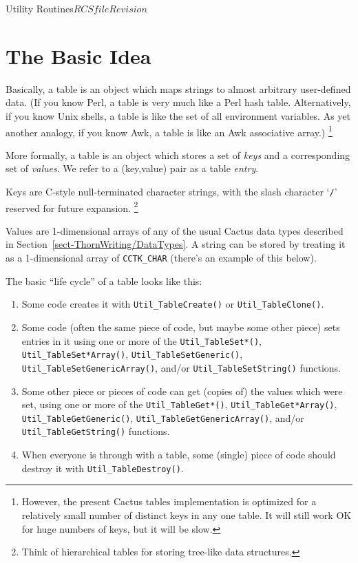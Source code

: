 \begin{cactuspart}{Utility Routines}{$RCSfile$}{$Revision$}

\section{The Basic Idea}

Basically, a table is an object which maps strings to almost arbitrary
user-defined data.  (If you know Perl, a table is very much like a
Perl hash table.  Alternatively, if you know Unix shells, a table is
like the set of all environment variables.  As yet another analogy,
if you know Awk, a table is like an Awk associative array.)%
\footnote{%
	 However, the present Cactus tables implementation
	 is optimized for a relatively small number of
	 distinct keys in any one table.  It will still
	 work OK for huge numbers of keys, but it will be
	 slow.
	 }%

More formally, a table is an object which stores a set of \textit{keys}
and a corresponding set of \textit{values}.  We refer to a (key,value)
pair as a table \textit{entry}.

Keys are C-style null-terminated character strings, with the slash
character `{\tt /}' reserved for future expansion.%
\footnote{%
	 Think of hierarchical tables for storing
	 tree-like data structures.%
	 }%

Values are 1-dimensional arrays of any of the usual Cactus data types
described in Section~\ref{sect-ThornWriting/DataTypes}.
A string can be stored by treating it as a 1-dimensional array of
\verb|CCTK_CHAR| (there's an example of this below).

The basic ``life cycle'' of a table looks like this:
\begin{enumerate}
\item	Some code creates it with \verb|Util_TableCreate()|
	or \verb|Util_TableClone()|.
\item	Some code (often the same piece of code, but maybe some
	other piece) sets entries in it using one or more of
	the \verb|Util_TableSet*()|, \verb|Util_TableSet*Array()|,
	\verb|Util_TableSetGeneric()|, \verb|Util_TableSetGenericArray()|,
	and/or \verb|Util_TableSetString()| functions.
\item	Some other piece or pieces of code can get (copies of)
	the values which were set, using one or more of the
	\verb|Util_TableGet*()|, \verb|Util_TableGet*Array()|,
	\verb|Util_TableGetGeneric()|, \verb|Util_TableGetGenericArray()|,
	and/or \verb|Util_TableGetString()| functions.
\item	When everyone is through with a table, some (single)
	piece of code should destroy it with \verb|Util_TableDestroy()|.
\end{enumerate}


\end{cactuspart}
